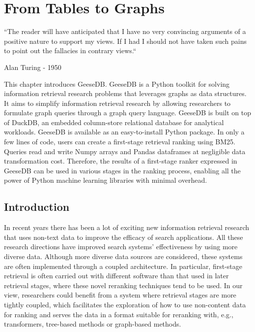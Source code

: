 \chapter{From Tables to Graphs}
\label{from-tables-to-graphs}
\epigraph{``The reader will have anticipated that I have no very convincing
	arguments of a positive nature to support my views. If I had I should not
	have taken such pains to point out the fallacies in contrary views.``}{Alan Turing - 1950}

\begin{Abstract}
	\begin{changemargin}{1cm}{1cm}
		This chapter introduces GeeseDB. GeeseDB is a Python toolkit for solving information retrieval research problems that leverages graphs as data structures. It aims to simplify information retrieval research by allowing researchers to formulate graph queries through a graph query language. GeeseDB is built on top of DuckDB, an embedded column-store relational database for analytical workloads. GeeseDB is available as an easy-to-install Python package. In only a few lines of code, users can create a first-stage retrieval ranking using BM25. Queries read and write Numpy arrays and Pandas dataframes at negligible data transformation cost. Therefore, the results of a first-stage ranker expressed in GeeseDB can be used in various stages in the ranking process, enabling all the power of Python machine learning libraries with minimal overhead.
	\end{changemargin}
\end{Abstract}

\section{Introduction}
In recent years there has been a lot of exciting new information retrieval research that uses non-text data to improve the efficacy of search applications. All these research directions have improved search systems' effectiveness by using more diverse data. Although more diverse data sources are considered, these systems are often implemented through a coupled architecture. In particular, first-stage retrieval is often carried out with different software than that used in later retrieval stages, where these novel reranking techniques tend to be used. In our view, researchers could benefit from a system where retrieval stages are more tightly coupled, which facilitates the exploration of how to use non-content data for ranking and serves the data in a format suitable for reranking with, e.g., transformers, tree-based methods or graph-based methods.

